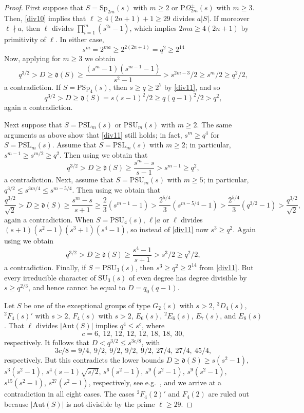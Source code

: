 \documentclass[11pt]{amsart}
\theoremstyle{plain}
\theoremstyle{definition}
\numberwithin{thm}{section}
\numberwithin{equation}{thm}
\newcommand{\Aut}{\mathrm{Aut}}
\newcommand{\PSL}{\mathrm{PSL}}
\newcommand{\SU}{\mathrm{SU}}
\newcommand{\PSU}{\mathrm{PSU}}
\newcommand{\Sp}{\mathrm{Sp}}
\newcommand{\PSp}{\mathrm{PSp}}
\newcommand{\0}{\emptyset}
\newcommand{\dl}{\mathfrak{d}}
\newcommand{\tw}[1]{{}^#1\!}
\begin{document}
\begin{proof}
First suppose that $S = \Sp_{2m}(s)$ with $m \geq 2$ or $\mathrm{P}\Omega^\pm_{2m}(s)$ with $m \geq 3$. Then, 
\eqref{div10} implies that $\ell \geq 4(2n+1)+1 \geq 29$ divides $a|S|$. If moreover $\ell \nmid a$, then $\ell$ divides
$\prod^m_{i=1}(s^{2i}-1)$, which implies $2ma \geq 4(2n+1)$ by primitivity of $\ell$. In either case, %
\begin{equation}\label{div11}
  s^m=2^{ma} \geq 2^{2(2n+1)} = q^2 \geq 2^{14}
\end{equation}  
Now, applying \cite[Theorem 1.1]{TZ} for $m \geq 3$ we obtain
$$q^{3/2} > D \geq \dl(S) \geq \frac{(s^m-1)(s^{m-1}-1)}{s^2-1} > s^{2m-3}/2 \geq s^m/2 \geq q^2/2,$$
a contradiction. If $S=\PSp_4(s)$, then $s \geq q \geq 2^7$ by \eqref{div11}, and so
$$q^{3/2} > D \geq \dl(S) = s(s-1)^2/2 \geq q(q-1)^2/2 > q^2,$$
again a contradiction.

Next suppose that $S = \PSL_m(s)$ or $\PSU_m(s)$ with $m \geq 2$. The same arguments as above show that 
\eqref{div11} still holds; in fact, $s^m \geq q^4$ for $S=\PSL_m(s)$. Assume that $S = \PSL_m(s)$ with $m \geq 2$; in particular, $s^{m-1} \geq s^{m/2} \geq q^2$. Then using \cite[Theorem 1.1]{TZ} we obtain that 
$$q^{3/2} > D \geq \dl(S) \geq \frac{s^m-s}{s-1} > s^{m-1} \geq q^{2},$$
a contradiction. Next, assume that $S = \PSU_m(s)$ with $m \geq 5$; in particular, $q^{3/2} \leq s^{3m/4} \leq s^{m-5/4}$. Then using \cite[Theorem 1.1]{TZ} we obtain that 
$$\frac{q^{3/2}}{\sqrt{2}} > D \geq \dl(S) \geq \frac{s^m-s}{s+1} \geq \frac{2}{3}(s^{m-1}-1) > \frac{2^{5/4}}{3}
   (s^{m-5/4}-1) > \frac{2^{5/4}}{3}(q^{3/2}-1) > \frac{q^{3/2}}{\sqrt{2}},$$
again a contradiction. When $S = \PSU_4(s)$, $\ell|a$ or $\ell$ divides 
$(s+1)(s^2-1)(s^3+1)(s^4-1)$, so instead of \eqref{div11} now $s^3 \geq q^2$. Again using \cite[Theorem 1.1]{TZ} we obtain
$$q^{3/2} > D \geq \dl(S) \geq \frac{s^4-1}{s+1} > s^3/2 \geq q^2/2,$$
a contradiction. Finally, if $S = \PSU_3(s)$, then $s^3 \geq q^2 \geq 2^{14}$ from \eqref{div11}.  But every irreducible 
character of $\SU_3(s)$ of even degree 
has degree divisible by $s \geq q^{2/3}$, and hence cannot be equal to
$D=q_0(q-1)$. 

Let $S$ be one of the exceptional groups of type $G_2(s)$ with $s>2$, $\tw3 D_4(s)$, $\tw2 F_4(s)'$ with $s>2$, $F_4(s)$ with 
$s>2$, $E_6(s)$, $\tw2 E_6(s)$, $E_7(s)$, and $E_8(s)$. That $\ell$ 
divides $|\Aut(S)|$ implies $q^4 \leq s^c$, where
$$c = 6,~12,~12,~12,~12,~18,~18,~30,$$
respectively. It follows that $D < q^{3/2} \leq s^{3c/8}$, with 
$$3c/8 = 9/4,~9/2,~9/2,~9/2,~9/2,~27/4,~27/4,~45/4,$$
respectively. But this contradicts the lower bounds 
$D \geq \dl(S) \geq s(s^2-1)$, $s^3(s^2-1)$, $s^4(s-1)\sqrt{s/2}$, $s^6(s^2-1)$, $s^9(s^2-1)$, $s^9(s^2-1)$, $s^{15}(s^2-1)$, $s^{27}(s^2-1)$, respectively, 
see e.g.\ \cite[Table I]{TZ}, and 
we arrive at a contradiction in all eight cases. The cases $\tw2 F_4(2)'$ and $F_4(2)$ are ruled out because
$|\Aut(S)|$ is not divisible by the prime $\ell \geq 29$. 


\end{proof}
\end{document}
